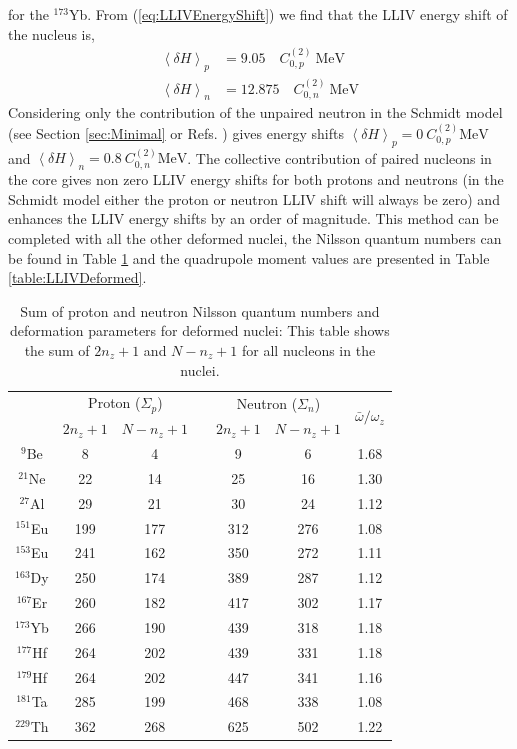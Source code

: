 \documentclass[10pt,a4paper, twoside]{report}
\begin{document}
for the $^{173}$Yb. 
From (\ref{eq:LLIVEnergyShift}) we find that the LLIV energy shift of the nucleus is,
\begin{align*}
\left<\delta H\right>_{p} &= 9.05 \quad C^{(2)}_{0,p} \ \text{MeV} \\
\left<\delta H\right>_n &=  12.875 \quad C^{(2)}_{0,n} \ \text{MeV}
\end{align*}
Considering only the contribution of the unpaired neutron in the Schmidt model (see Section \ref{sec:Minimal} or Refs. \cite{Kostelecky1999,Flambaum2016}) gives energy shifts $\left<\delta H\right>_{p} = 0 \ C^{(2)}_{0,p} \text{MeV}$ and $\left<\delta H\right>_n = 0.8 \ C^{(2)}_{0,n} \text{MeV}$. The collective contribution of paired nucleons in the core gives non zero LLIV energy shifts for both protons and neutrons (in the Schmidt model either the proton or neutron LLIV shift will always be zero) and enhances the LLIV energy shifts by an order of magnitude. This method can be completed with all the other deformed nuclei, the Nilsson quantum numbers can be found in Table \ref{table:NzNumbers} and the quadrupole moment values are presented in Table \ref{table:LLIVDeformed}.\\
\linebreak
\begin{table}[h!]
\centering
\caption[Deformation parameters for deformed nuclei of interest.]{Sum of proton and neutron Nilsson quantum numbers and deformation parameters for deformed nuclei: This table shows the sum of $2n_z + 1$ and $N - n_z + 1$ for all nucleons in the nuclei.}
\begin{tabular}{ccccccc}
\toprule
\toprule
 & \multicolumn{2}{c}{Proton ($\Sigma_p$)} & & \multicolumn{2}{c}{Neutron ($\Sigma_n$)} & \multirow{2}{*}{$\bar{\omega}/\omega_z$} \\
\cline{2-3} \cline{5-6}
 & $2n_z + 1$ & $N - n_z + 1$ & & $2n_z + 1$ & $N - n_z + 1$ &  \\
\midrule
$^{9}$Be   & 8   & 4  & & 9   & 6   & 1.68\\
$^{21}$Ne  & 22  & 14 & & 25  & 16  & 1.30\\
$^{27}$Al  & 29  & 21  &  & 30  & 24  & 1.12\\
$^{151}$Eu & 199 & 177 & & 312 & 276 & 1.08\\
$^{153}$Eu & 241 & 162 & & 350 & 272 & 1.11\\
$^{163}$Dy & 250 & 174 & & 389 & 287 & 1.12\\
$^{167}$Er & 260 & 182 & & 417 & 302 & 1.17\\
$^{173}$Yb & 266 & 190 & & 439 & 318 & 1.18\\
$^{177}$Hf & 264 & 202 & & 439 & 331 & 1.18\\
$^{179}$Hf & 264 & 202 & & 447 & 341 & 1.16\\
$^{181}$Ta & 285 & 199 & & 468 & 338 & 1.08\\
$^{229}$Th & 362 & 268 & & 625 & 502 & 1.22\\
\bottomrule
\bottomrule
\end{tabular}

\label{table:NzNumbers}
\end{table}
\end{document}
